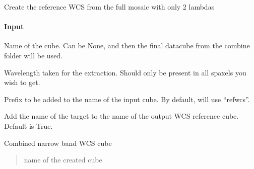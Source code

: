 \documentclass[letterpaper,10pt,english]{sphinxmanual}
\begin{document}
\begin{fulllineitems}

\begin{fulllineitems}
\label{\detokenize{api/pymusepipe:pymusepipe.combine.MusePointings.extract_combined_narrow_wcs}}
\pysigstartsignatures
{}
\pysigstopsignatures
\sphinxAtStartPar
Create the reference WCS from the full mosaic with only 2 lambdas


\paragraph{Input}
\label{\detokenize{api/pymusepipe:id46}}\begin{description}
\sphinxAtStartPar
Name of the cube. Can be None, and then the final datacube from the combine
folder will be used.

\sphinxAtStartPar
Wavelength taken for the extraction. Should only be present in all spaxels
you wish to get.

\sphinxAtStartPar
Prefix to be added to the name of the input cube. By default, will use “refwcs”.

\sphinxAtStartPar
Add the name of the target to the name of the output WCS reference cube.
Default is True.

\sphinxAtStartPar
Combined narrow band WCS cube

\end{description}
\begin{quote}\begin{description}
\sphinxAtStartPar
name of the created cube

\end{description}\end{quote}

\end{fulllineitems}



\end{fulllineitems}
\end{document}
